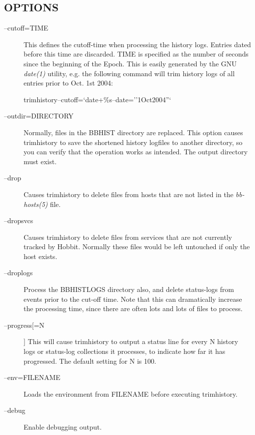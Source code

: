  
\subsection{OPTIONS}
\begin{description}
\item[--cutoff=TIME] This defines the cutoff-time when processing the
  history logs. Entries dated before this time are discarded. TIME is
  specified as the number of seconds since the beginning of the
  Epoch. This is easily generated by the GNU \emph{date(1)} utility,
  e.g. the following command will trim history logs of all entries
  prior to Oct. 1st 2004:  



  
trimhistory--cutoff=`date+\%s--date=''1Oct2004''` 


 

\item[--outdir=DIRECTORY] Normally, files in the BBHIST directory are
  replaced. This option causes trimhistory to save the shortened
  history logfiles to another directory, so you can verify that the
  operation works as intended. The output directory must exist. 


 

\item[--drop] Causes trimhistory to delete files from hosts that are
  not listed in the \emph{bb-hosts(5)} file. 

 

\item[--dropsvcs] Causes trimhistory to delete files from services
  that are not currently tracked by Hobbit. Normally these files would
  be left untouched if only the host exists. 

 

\item[--droplogs] Process the BBHISTLOGS directory also, and delete
  status-logs from events prior to the cut-off time. Note that this
  can dramatically increase the processing time, since there are often
  lots and lots of files to process. 


 

\item[--progress[=N]] This will cause trimhistory to output a status
  line for every N history logs or status-log collections it
  processes, to indicate how far it has progressed. The default
  setting for N is 100. 


 

\item[--env=FILENAME] Loads the environment from FILENAME before executing trimhistory. 

 

\item[--debug] Enable debugging output. 

 
\end{description}
